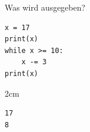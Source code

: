 \question[2]
Was wird ausgegeben?
\begin{lstlisting}
x = 17
print(x)
while x >= 10:    
    x -= 3
print(x)
\end{lstlisting}
\begin{solutionbox}{2cm}
\begin{lstlisting}
17
8
\end{lstlisting}
\end{solutionbox}